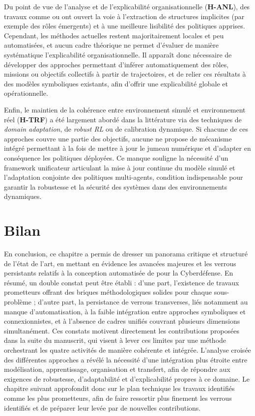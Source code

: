 

Du point de vue de l'analyse et de l'explicabilité organisationnelle (\textbf{H-ANL}), des travaux comme  ou  ont ouvert la voie à l'extraction de structures implicites (par exemple des rôles émergents) et à une meilleure lisibilité des politiques apprises. Cependant, les méthodes actuelles restent majoritairement locales et peu automatisées, et aucun cadre théorique ne permet d'évaluer de manière systématique l'explicabilité organisationnelle. Il apparaît donc nécessaire de développer des approches permettant d'inférer automatiquement des rôles, missions ou objectifs collectifs à partir de trajectoires, et de relier ces résultats à des modèles symboliques existants, afin d'offrir une explicabilité globale et opérationnelle.

Enfin, le maintien de la cohérence entre environnement simulé et environnement réel (\textbf{H-TRF}) a été largement abordé dans la littérature via des techniques de \textit{domain adaptation}, de \textit{robust RL} ou de calibration dynamique. Si chacune de ces approches couvre une partie des objectifs, aucune ne propose de mécanisme intégré permettant à la fois de mettre à jour le jumeau numérique et d'adapter en conséquence les politiques déployées. Ce manque souligne la nécessité d'un framework unificateur articulant la mise à jour continue du modèle simulé et l'adaptation conjointe des politiques multi-agents, condition indispensable pour garantir la robustesse et la sécurité des systèmes dans des environnements dynamiques.



\section{Bilan}
\noindent En conclusion, ce chapitre a permis de dresser un panorama critique et structuré de l'état de l'art, en mettant en évidence les avancées majeures et les verrous persistants relatifs à la conception automatisée de  pour la Cyberdéfense. En résumé, un double constat peut être établi : d'une part, l'existence de travaux prometteurs offrant des briques méthodologiques solides pour chaque sous-problème ; d'autre part, la persistance de verrous transverses, liés notamment au manque d'automatisation, à la faible intégration entre approches symboliques et connexionnistes, et à l'absence de cadres unifiés couvrant plusieurs dimensions simultanément. Ces constats motivent directement les contributions proposées dans la suite du manuscrit, qui visent à lever ces limites par une méthode orchestrant les quatre activités de manière cohérente et intégrée. L'analyse croisée des différentes approches a révélé la nécessité d'une intégration plus étroite entre modélisation, apprentissage, organisation et transfert, afin de répondre aux exigences de robustesse, d'adaptabilité et d'explicabilité propres à ce domaine. Le chapitre suivant approfondit donc sur le plan technique les travaux identifiés comme les plus prometteurs, afin de faire ressortir plus finement les verrous identifiés et de préparer leur levée par de nouvelles contributions.

